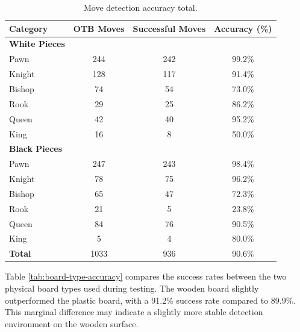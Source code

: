 \begin{table}[htbp]
\centering
\caption[Move detection accuracy total]{Move detection accuracy total.}
\label{tab:accuracy-total}
\begin{tabular}{lccc}
\toprule
\textbf{Category} & \textbf{OTB Moves} & \textbf{Successful Moves} & \textbf{Accuracy (\%)} \\
\midrule
\textbf{White Pieces} & & & \\
\hspace{1em}Pawn  & 244 & 242 & 99.2\% \\
\hspace{1em}Knight & 128 & 117 & 91.4\% \\
\hspace{1em}Bishop & 74  & 54  & 73.0\% \\
\hspace{1em}Rook   & 29  & 25  & 86.2\% \\
\hspace{1em}Queen  & 42  & 40  & 95.2\% \\
\hspace{1em}King   & 16  & 8   & 50.0\% \\
\midrule
\textbf{Black Pieces} & & & \\
\hspace{1em}Pawn  & 247 & 243 & 98.4\% \\
\hspace{1em}Knight & 78  & 75  & 96.2\% \\
\hspace{1em}Bishop & 65  & 47  & 72.3\% \\
\hspace{1em}Rook   & 21  & 5   & 23.8\% \\
\hspace{1em}Queen  & 84  & 76  & 90.5\% \\
\hspace{1em}King   & 5   & 4   & 80.0\% \\
\midrule
\textbf{Total} & 1033 & 936 & 90.6\% \\
\bottomrule
\end{tabular}
\end{table}


Table \ref{tab:board-type-accuracy} compares the success rates between the two physical board types used during testing. The wooden board slightly outperformed the plastic board, with a 91.2\% success rate compared to 89.9\%. This marginal difference may indicate a slightly more stable detection environment on the wooden surface. \\



